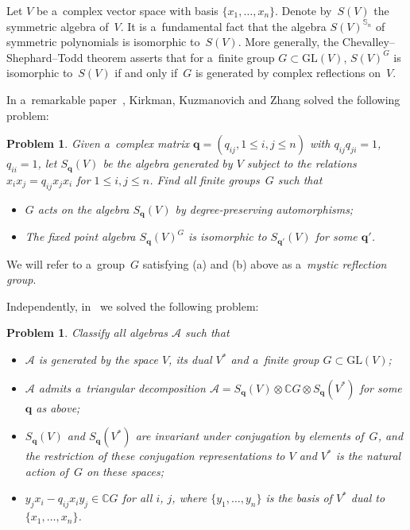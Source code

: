 \documentclass[pdftex]{sigma}
\newtheorem{problem}[Theorem]{Problem}
{\theoremstyle{definition}
\newtheorem{Definition}[Theorem]{Definition}
\newtheorem{Remark}[Theorem]{Remark}}
\begin{document}
Let $V$ be a~complex vector space with basis $\{x_1,\ldots,x_n\}$.
Denote by~$S(V)$ the symmetric algebra of~$V$.
It is a~fundamental fact that the algebra $S(V)^{\mathbb{S}_n}$ of symmetric polynomials is isomorphic to~$S(V)$.
More generally, the Chevalley--Shephard--Todd theorem asserts that for a~f\/inite group $G\subset \mathrm{GL}(V)$, $S(V)^G$
is isomorphic to~$S(V)$ if and only if~$G$ is generated by complex ref\/lections on~$V$.

In a~remarkable paper~\cite{KKZ}, Kirkman, Kuzmanovich and Zhang solved the following problem:

\begin{problem}\label{prob:kkz}
Given a~complex matrix ${\mathbf q}=(q_{ij},1\le i,j\le n)$ with $q_{ij}q_{ji}=1$, $q_{ii}=1$, let $S_{\mathbf q}(V)$ be
the algebra generated by $V$ subject to the relations $x_ix_j=q_{ij}x_jx_i$ for $1\le i,j\le n$.
Find all finite groups~$G$ such that
\begin{itemize}\itemsep=0pt
\item[$(a)$] $G$ acts on the algebra $S_{\mathbf q}(V)$ by degree-preserving automorphisms;
\item[$(b)$] The fixed point
algebra $S_{\mathbf q}(V)^G$ is isomorphic to $S_{{\mathbf q}'}(V)$ for some ${\mathbf q'}$.
\end{itemize}
\end{problem}

We will refer to a~group~$G$ satisfying (a) and (b) above as a~\textit{mystic reflection group}.

Independently, in~\cite{BBselecta} we solved the following problem:

\begin{problem}
\label{prob:braided cherednik}
Classify all algebras ${\mathcal A}$ such that
\begin{itemize}\itemsep=0pt
\item
${\mathcal A}$ is generated by the space $V$, its dual $V^*$ and a~finite group $G\subset
\mathrm{GL}(V)$;
\item
${\mathcal A}$ admits a~triangular decomposition ${\mathcal A}=S_{\mathbf q}(V)\otimes \mathbb C G\otimes S_{\mathbf q}
(V^*)$ for some ${\mathbf q}$ as above;
\item
$S_{\mathbf q}(V)$ and $S_{\mathbf q}(V^*)$ are invariant under conjugation by elements of~$G$, and the restriction of
these conjugation representations to $V$ and $V^*$ is the natural action of~$G$ on these spaces;
\item
$y_jx_i-q_{ij}x_iy_j\in \mathbb C G$ for all $i$, $j$, where $\{y_1,\ldots,y_n\}$ is the basis of $V^*$ dual to
$\{x_1,\ldots,x_n\}$.
\end{itemize}
\end{problem}
\end{document}
